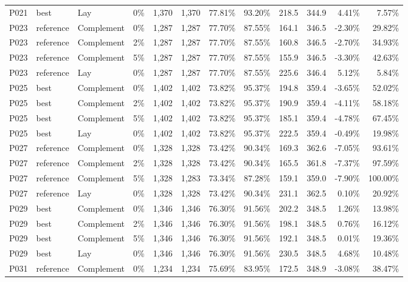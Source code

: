 \begin{longtable}{llllrrrrrrrr}
P021 & best & Lay & 0\% & 1,370 & 1,370 & 77.81\% & 93.20\% & 218.5 & 344.9 & 4.41\% & 7.57\% \\
P023 & reference & Complement & 0\% & 1,287 & 1,287 & 77.70\% & 87.55\% & 164.1 & 346.5 & -2.30\% & 29.82\% \\
P023 & reference & Complement & 2\% & 1,287 & 1,287 & 77.70\% & 87.55\% & 160.8 & 346.5 & -2.70\% & 34.93\% \\
P023 & reference & Complement & 5\% & 1,287 & 1,287 & 77.70\% & 87.55\% & 155.9 & 346.5 & -3.30\% & 42.63\% \\
P023 & reference & Lay & 0\% & 1,287 & 1,287 & 77.70\% & 87.55\% & 225.6 & 346.4 & 5.12\% & 5.84\% \\
P025 & best & Complement & 0\% & 1,402 & 1,402 & 73.82\% & 95.37\% & 194.8 & 359.4 & -3.65\% & 52.02\% \\
P025 & best & Complement & 2\% & 1,402 & 1,402 & 73.82\% & 95.37\% & 190.9 & 359.4 & -4.11\% & 58.18\% \\
P025 & best & Complement & 5\% & 1,402 & 1,402 & 73.82\% & 95.37\% & 185.1 & 359.4 & -4.78\% & 67.45\% \\
P025 & best & Lay & 0\% & 1,402 & 1,402 & 73.82\% & 95.37\% & 222.5 & 359.4 & -0.49\% & 19.98\% \\
P027 & reference & Complement & 0\% & 1,328 & 1,328 & 73.42\% & 90.34\% & 169.3 & 362.6 & -7.05\% & 93.61\% \\
P027 & reference & Complement & 2\% & 1,328 & 1,328 & 73.42\% & 90.34\% & 165.5 & 361.8 & -7.37\% & 97.59\% \\
P027 & reference & Complement & 5\% & 1,328 & 1,283 & 73.34\% & 87.28\% & 159.1 & 359.0 & -7.90\% & 100.00\% \\
P027 & reference & Lay & 0\% & 1,328 & 1,328 & 73.42\% & 90.34\% & 231.1 & 362.5 & 0.10\% & 20.92\% \\
P029 & best & Complement & 0\% & 1,346 & 1,346 & 76.30\% & 91.56\% & 202.2 & 348.5 & 1.26\% & 13.98\% \\
P029 & best & Complement & 2\% & 1,346 & 1,346 & 76.30\% & 91.56\% & 198.1 & 348.5 & 0.76\% & 16.12\% \\
P029 & best & Complement & 5\% & 1,346 & 1,346 & 76.30\% & 91.56\% & 192.1 & 348.5 & 0.01\% & 19.36\% \\
P029 & best & Lay & 0\% & 1,346 & 1,346 & 76.30\% & 91.56\% & 230.5 & 348.5 & 4.68\% & 10.48\% \\
P031 & reference & Complement & 0\% & 1,234 & 1,234 & 75.69\% & 83.95\% & 172.5 & 348.9 & -3.08\% & 38.47\% \\

\end{longtable}
